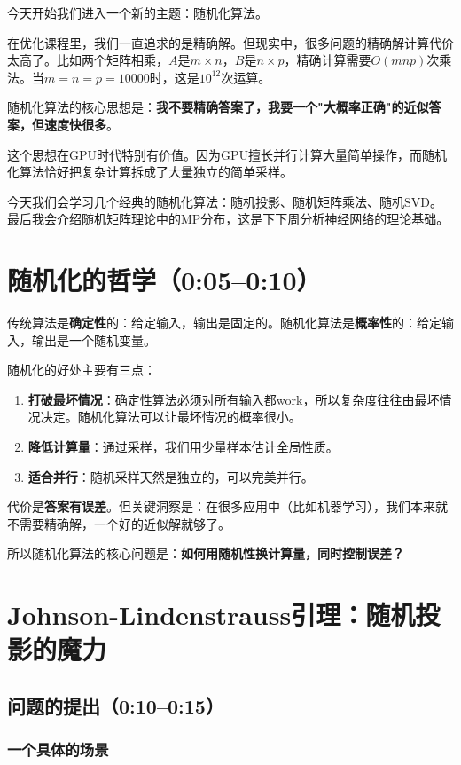 \documentclass[11pt,a4paper]{ctexart}
\theoremstyle{definition}
\theoremstyle{remark}
\begin{document}
今天开始我们进入一个新的主题：随机化算法。

在优化课程里，我们一直追求的是精确解。但现实中，很多问题的精确解计算代价太高了。比如两个矩阵相乘，$A$是$m \times n$，$B$是$n \times p$，精确计算需要$O(mnp)$次乘法。当$m = n = p = 10000$时，这是$10^{12}$次运算。

随机化算法的核心思想是：\textbf{我不要精确答案了，我要一个"大概率正确"的近似答案，但速度快很多}。

这个思想在GPU时代特别有价值。因为GPU擅长并行计算大量简单操作，而随机化算法恰好把复杂计算拆成了大量独立的简单采样。

今天我们会学习几个经典的随机化算法：随机投影、随机矩阵乘法、随机SVD。最后我会介绍随机矩阵理论中的MP分布，这是下下周分析神经网络的理论基础。

\section{随机化的哲学（0:05--0:10）}

传统算法是\textbf{确定性}的：给定输入，输出是固定的。随机化算法是\textbf{概率性}的：给定输入，输出是一个随机变量。

随机化的好处主要有三点：
\begin{enumerate}
    \item \textbf{打破最坏情况}：确定性算法必须对所有输入都work，所以复杂度往往由最坏情况决定。随机化算法可以让最坏情况的概率很小。
    \item \textbf{降低计算量}：通过采样，我们用少量样本估计全局性质。
    \item \textbf{适合并行}：随机采样天然是独立的，可以完美并行。
\end{enumerate}

代价是\textbf{答案有误差}。但关键洞察是：在很多应用中（比如机器学习），我们本来就不需要精确解，一个好的近似解就够了。

所以随机化算法的核心问题是：\textbf{如何用随机性换计算量，同时控制误差？}

\section{Johnson-Lindenstrauss引理：随机投影的魔力}

\subsection{问题的提出（0:10--0:15）}

\subsubsection{一个具体的场景}
\end{document}

